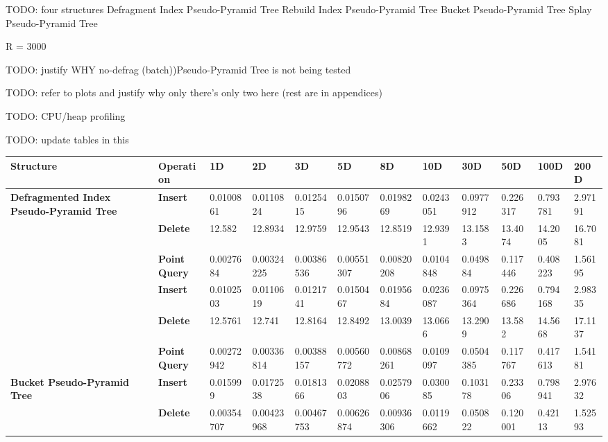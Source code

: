 TODO: four structures
	Defragment Index Pseudo-Pyramid Tree
	Rebuild Index Pseudo-Pyramid Tree
	Bucket Pseudo-Pyramid Tree
	Splay Pseudo-Pyramid Tree

	R = 3000

TODO: justify WHY no-defrag (batch))Pseudo-Pyramid Tree is not being tested

TODO: refer to plots and justify why only there's only two here (rest are in appendices)

TODO: CPU/heap profiling

\begin{landscape}

	TODO: update tables in this

	\begin{table}
		\centering
		\begin{tabular}{|p{2cm}|l|l|l|l|l|l|l|l|l|l|l|}
			\hline
			\textbf{Structure} & \textbf{Operation} & \textbf{1D} & \textbf{2D} & \textbf{3D} & \textbf{5D} & \textbf{8D} & \textbf{10D} & \textbf{30D} & \textbf{50D} & \textbf{100D} & \textbf{200D} \\
			\hline
			\multirow{ 4}{*}{\textbf{Defragmented Index Pseudo-Pyramid Tree}} & \textbf{Insert} & 0.0100861 & 0.0110824 & 0.0125415 & 0.0150796 & 0.0198269 & 0.0243051 & 0.0977912 & 0.226317 & 0.793781 & 2.97191 \\
			 & \textbf{Delete} & 12.582 & 12.8934 & 12.9759 & 12.9543 & 12.8519 & 12.9391 & 13.1583 & 13.4074 & 14.2005 & 16.7081 \\
			 & \textbf{Point Query} & 0.0027684 & 0.00324225 & 0.00386536 & 0.00551307 & 0.00820208 & 0.0104848 & 0.049884 & 0.117446 & 0.408223 & 1.56195 \\
			\hline
			\multirow{ 4}{*}{\textbf{Rebuild Index Pseudo-Pyramid Tree}} & \textbf{Insert} & 0.0102503 & 0.0110619 & 0.0121741 & 0.0150467 & 0.0195684 & 0.0236087 & 0.0975364 & 0.226686 & 0.794168 & 2.98335 \\
			 & \textbf{Delete} & 12.5761 & 12.741 & 12.8164 & 12.8492 & 13.0039 & 13.0666 & 13.2909 & 13.582 & 14.5668 & 17.1137 \\
			 & \textbf{Point Query} & 0.00272942 & 0.00336814 & 0.00388157 & 0.00560772 & 0.00868261 & 0.0109097 & 0.0504385 & 0.117767 & 0.417613 & 1.54181 \\
			\hline
			\multirow{ 4}{*}{\textbf{Bucket Pseudo-Pyramid Tree}} & \textbf{Insert} & 0.015999 & 0.0172538 & 0.0181366 & 0.0208803 & 0.0257906 & 0.030085 & 0.103178 & 0.23306 & 0.798941 & 2.97632 \\
			 & \textbf{Delete} & 0.00354707 & 0.00423968 & 0.00467753 & 0.00626874 & 0.00936306 & 0.0119662 & 0.050822 & 0.120001 & 0.42113 & 1.52593 \\

\end{tabular}
\end{table}
\end{landscape}

